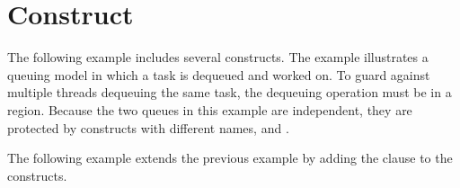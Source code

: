 \pagebreak
\section{ Construct}
\label{sec:critical}

The following example includes several  constructs. The example 
illustrates a queuing model in which a task is dequeued and worked on. To guard 
against multiple threads dequeuing the same task, the dequeuing operation must 
be in a  region. Because the two queues in this example are independent, 
they are protected by  constructs with different names,  
and .



The following example extends the previous example by adding the  clause to the  constructs.


